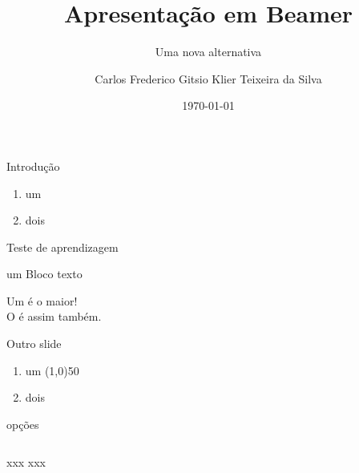 \documentclass{beamer}
\title[título curto]{Apresentação em Beamer}
\subtitle[subt curto]{Uma nova alternativa}
\author[Fred Klier]{Carlos Frederico Gitsio Klier Teixeira da Silva}
\institute{Colégio Nossa Senhora Medianeira}
\date[dd/mm/yyyy]{\today}
\begin{document}

\begin{frame}
		\maketitle
\end{frame}

	\begin{frame}[t]{Introdução}\vspace{10pt} %

		\begin{enumerate}
			\item um
			\item dois
		\end{enumerate}
	\end{frame}

\begin{frame}[t]{Teste de aprendizagem}\vspace{10pt} %

	\begin{block}{um Bloco}
		\vspace{0.5em}
		texto
		\vspace{0.5em}
	\end{block}
	Um    é o maior!\\[10pt]
	O \only<1>{\line(1,0){50} \,}   é assim também.
\end{frame}

\begin{frame}[t]{Outro slide}\vspace{10pt} %

	\begin{enumerate}
		\item um \line(1,0){50}
		\item dois
	\end{enumerate}
\end{frame}

\begin{frame}[t]{opções}\vspace{10pt} %
	\begin{columns}[onlytextwith] %
		\columns[0.5\textwidth]
		xxx
		\columns[0.5\textwidth]
		xxx
	\end{columns}
\end{frame}
\end{document}
